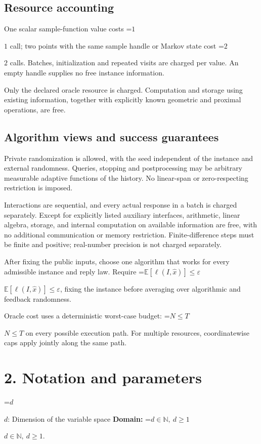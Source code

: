 \documentclass[10pt,a4paper]{article}
\newcommand{\AtlasMath}[1]{\par\begingroup\centering\setbox0=\hbox{$\displaystyle #1$}\ifdim\wd0>1.4\linewidth\typeout{ATLAS WIDE FORMULA: \the\wd0}\fi\ifdim\wd0>\linewidth\resizebox{\linewidth}{!}{\box0}\else\box0\fi\par\endgroup}
\newcommand{\AtlasInlineMath}[1]{\begingroup\setbox0=\hbox{$#1$}\ifdim\wd0>.4\linewidth\endgroup\AtlasMath{#1}\else\endgroup$#1$\fi}
\begin{document}
\subsection{Resource accounting}
One scalar sample-function value costs \AtlasInlineMath{1} call; two points with the same sample handle or Markov state cost \AtlasInlineMath{2} calls. Batches, initialization and repeated visits are charged per value. An empty handle supplies no free instance information.

Only the declared oracle resource is charged. Computation and storage using existing information, together with explicitly known geometric and proximal operations, are free.

\subsection{Algorithm views and success guarantees}
Private randomization is allowed, with the seed independent of the instance and external randomness. Queries, stopping and postprocessing may be arbitrary measurable adaptive functions of the history. No linear-span or zero-respecting restriction is imposed.

Interactions are sequential, and every actual response in a batch is charged separately. Except for explicitly listed auxiliary interfaces, arithmetic, linear algebra, storage, and internal computation on available information are free, with no additional communication or memory restriction. Finite-difference steps must be finite and positive; real-number precision is not charged separately.

After fixing the public inputs, choose one algorithm that works for every admissible instance and reply law. Require \AtlasInlineMath{\mathbb{E}[\ell(I,\widehat{x})]\le \varepsilon}, fixing the instance before averaging over algorithmic and feedback randomness.

Oracle cost uses a deterministic worst-case budget: \AtlasInlineMath{N\le T} on every possible execution path. For multiple resources, coordinatewise caps apply jointly along the same path.

\section{2. Notation and parameters}
\AtlasInlineMath{d}: Dimension of the variable space \textbf{Domain:} \AtlasInlineMath{d\in\mathbb{N},\ d\ge1}.
\end{document}
